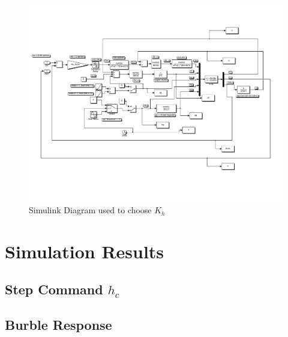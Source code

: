 \documentclass[12pt]{article}
\begin{document}
\begin{figure}[h!]
\begin{center}
\includegraphics[width=.95\textwidth]{figures/Kp_h_gain}
\caption{Simulink Diagram used to choose $K_{h}$}
\end{center}
\end{figure}

\clearpage
\section{Simulation Results}
\subsection{Step Command $h_c$}
\subsection{Burble Response}

\clearpage
\end{document}
